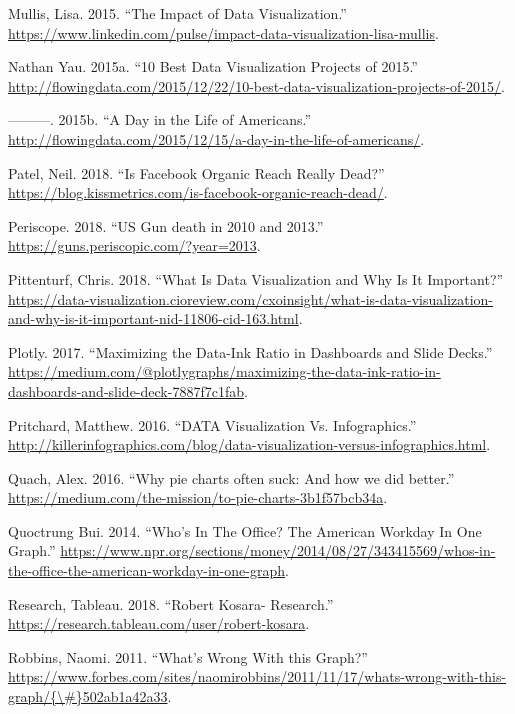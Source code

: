 \documentclass[]{book}
\theoremstyle{definition}
\theoremstyle{definition}
\theoremstyle{definition}
\theoremstyle{remark}
\begin{document}
\hypertarget{ref-image_good}{}
Mullis, Lisa. 2015. ``The Impact of Data Visualization.''
\url{https://www.linkedin.com/pulse/impact-data-visualization-lisa-mullis}.

\hypertarget{ref-10_best}{}
Nathan Yau. 2015a. ``10 Best Data Visualization Projects of 2015.''
\url{http://flowingdata.com/2015/12/22/10-best-data-visualization-projects-of-2015/}.

\hypertarget{ref-American_life}{}
---------. 2015b. ``A Day in the Life of Americans.''
\url{http://flowingdata.com/2015/12/15/a-day-in-the-life-of-americans/}.

\hypertarget{ref-facebook_organic}{}
Patel, Neil. 2018. ``Is Facebook Organic Reach Really Dead?''
\url{https://blog.kissmetrics.com/is-facebook-organic-reach-dead/}.

\hypertarget{ref-narratives_2017}{}
Periscope. 2018. ``US Gun death in 2010 and 2013.''
\url{https://guns.periscopic.com/?year=2013}.

\hypertarget{ref-viz_importance}{}
Pittenturf, Chris. 2018. ``What Is Data Visualization and Why Is It
Important?''
\url{https://data-visualization.cioreview.com/cxoinsight/what-is-data-visualization-and-why-is-it-important-nid-11806-cid-163.html}.

\hypertarget{ref-appli_2017}{}
Plotly. 2017. ``Maximizing the Data-Ink Ratio in Dashboards and Slide
Decks.''
\url{https://medium.com/@plotlygraphs/maximizing-the-data-ink-ratio-in-dashboards-and-slide-deck-7887f7c1fab}.

\hypertarget{ref-VIZVSINFO}{}
Pritchard, Matthew. 2016. ``DATA Visualization Vs. Infographics.''
\url{http://killerinfographics.com/blog/data-visualization-versus-infographics.html}.

\hypertarget{ref-quach-penny}{}
Quach, Alex. 2016. ``Why pie charts often suck: And how we did better.''
\url{https://medium.com/the-mission/to-pie-charts-3b1f57bcb34a}.

\hypertarget{ref-NPR_workday}{}
Quoctrung Bui. 2014. ``Who's In The Office? The American Workday In One
Graph.''
\url{https://www.npr.org/sections/money/2014/08/27/343415569/whos-in-the-office-the-american-workday-in-one-graph}.

\hypertarget{ref-research_viz}{}
Research, Tableau. 2018. ``Robert Kosara- Research.''
\url{https://research.tableau.com/user/robert-kosara}.

\hypertarget{ref-whats_wrong}{}
Robbins, Naomi. 2011. ``What's Wrong With this Graph?''
\href{https://www.forbes.com/sites/naomirobbins/2011/11/17/whats-wrong-with-this-graph/\%7B/\#\%7D502ab1a42a33}{https://www.forbes.com/sites/naomirobbins/2011/11/17/whats-wrong-with-this-graph/\{\textbackslash{}\#\}502ab1a42a33}.
\end{document}
